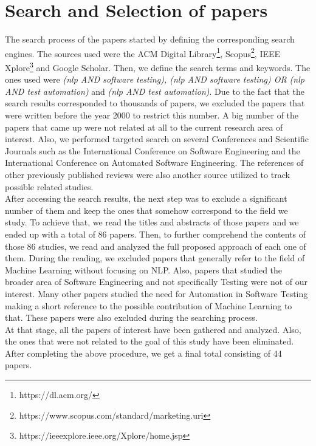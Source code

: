 \section {Search and Selection of papers}
The search process of the papers started by defining the corresponding search engines. The sources used were the ACM Digital Library\footnote{https://dl.acm.org/}, Scopus\footnote{https://www.scopus.com/standard/marketing.uri}, 
IEEE Xplore\footnote{https://ieeexplore.ieee.org/Xplore/home.jsp} and Google Scholar. Then, we define the search terms and keywords. The ones used were \emph{(nlp AND software testing), (nlp 
AND software testing) OR (nlp AND test automation)} and \emph{(nlp AND test automation)}. Due to the fact that the search results corresponded 
to thousands of papers, we excluded the papers that were written before the year 2000 to restrict this number. A big number of the papers that came up 
were not related at all to the current research area of interest. Also, we performed targeted search on several Conferences and Scientific Journals such 
as the International Conference on Software Engineering and the International Conference on Automated Software Engineering. The references of other previously 
published reviews were also another source utilized to track possible related studies. \\

After accessing the search results, the next step was to exclude a significant number of them and keep the ones that somehow correspond to the field we study. 
To achieve that, we read the titles and abstracts of those papers and we ended up with a total of 86 papers. Then, to further comprehend the contents of those 86 studies, 
we read and analyzed the full proposed approach of each one of them. During the reading, we excluded papers that generally refer to the field of 
Machine Learning without focusing on NLP. Also, papers that studied the broader area of Software Engineering and not specifically Testing were not 
of our interest. Many other papers studied the need for Automation in Software Testing making a short reference to the possible contribution of Machine 
Learning to that. These papers were also excluded during the searching process. \\

At that stage, all the papers of interest have been gathered and analyzed. Also, the ones that were not related to the goal of this study have been 
eliminated. After completing the above procedure, we get a final total consisting of 44 papers. 